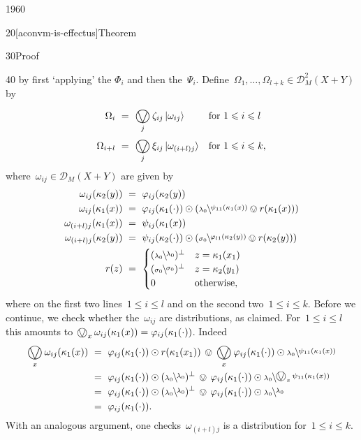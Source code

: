 \begin{parsec}{1960}
\begin{point}{20}[aconvm-is-effectus]{Theorem}
\begin{point}{30}{Proof}
\begin{point}{40}
    by first `applying' the $\Phi_i$ and then
    the~$\Psi_i$.
Define~$\Omega_1, \ldots, \Omega_{l+k} \in \mathcal{D}_M^2 (X+Y)$ by
\begin{align*}
    \Omega_i  &\ = \ \bigovee_j\zeta_{ij} \ket{\omega_{ij}}
        &&\text{for $1 \leq i \leq l$}
    \\
    \Omega_{i+l}  &\ = \ \bigovee_j \xi_{ij} \ket{\omega_{(i+l)j}}
        &&\text{for $1 \leq i \leq k$,}
\end{align*}
where~$\omega_{ij} \in \mathcal{D}_M(X+Y)$
are given by
\begin{align*}
    \omega_{ij} (\kappa_2 (y)) &\ =\ \varphi_{ij}(\kappa_2(y))  \\
    \omega_{ij} (\kappa_1(x)) &\ = \ 
    \varphi_{ij}(\kappa_1(\cdot))\odot
    ( \rfrac{\psi_{11}(\kappa_1(x))}{\lambda_0}
    \ovee r(\kappa_1(x)))
    \\
    \omega_{(i+l)j} (\kappa_1(x)) &\ =\ \psi_{ij}(\kappa_1(x)) \\
    \omega_{(i+l)j} (\kappa_2 (y)) &\ =\ 
    \psi_{ij}(\kappa_2(\cdot)) \odot (
    \rfrac{\varphi_{l1}(\kappa_2(y))}{\sigma_0}
    \ovee r(\kappa_2(y))) \\
    r(z) & \ = \ 
    \begin{cases}
        (\rfrac{\lambda_0}{\lambda_0})^\perp & z = \kappa_1(x_1) \\
        (\rfrac{\sigma_0}{\sigma_0})^\perp & z = \kappa_2(y_1) \\
        0 & \text{otherwise},
    \end{cases}
\end{align*}
    where on the first two lines~$1 \leq i \leq l$
    and on the second two~$1 \leq i \leq k$.
Before we continue, we check whether the~$\omega_{ij}$
    are distributions, as claimed.
For~$1 \leq i \leq l$
    this amounts to $\bigovee_x \omega_{ij}(\kappa_1(x))
= \varphi_{ij}(\kappa_1(\cdot))$.
Indeed
\begin{align*}
\bigovee_x
    \omega_{ij}(\kappa_1(x))
    & \  =\  \varphi_{ij}(\kappa_1(\cdot)) \odot r(\kappa_1(x_1))
            \,\ovee\, \bigovee_x 
        \varphi_{ij}(\kappa_1(\cdot)) \odot
        \rfrac{\psi_{11}(\kappa_1(x))}{\lambda_0} \\
        & \  =\  \varphi_{ij}(\kappa_1(\cdot)) \odot (\rfrac{\lambda_0}{\lambda_0})^\perp
            \,\ovee \,
        \varphi_{ij}(\kappa_1(\cdot)) \odot
        \rfrac{\bigovee_x \psi_{11}(\kappa_1(x))}{\lambda_0} \\
        & \  =\  \varphi_{ij}(\kappa_1(\cdot)) \odot (\rfrac{\lambda_0}{\lambda_0})^\perp
            \,\ovee \,
        \varphi_{ij}(\kappa_1(\cdot)) \odot
        \rfrac{\lambda_0}{\lambda_0} \\
        & \  =\  \varphi_{ij}(\kappa_1(\cdot)).
\end{align*}
With an analogous argument, one checks~$\omega_{(i+l)j}$
    is a distribution for~$1 \leq i \leq k$.


\end{point}
\end{point}
\end{point}
\end{parsec}
